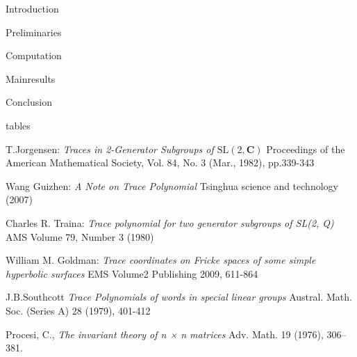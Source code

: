 \documentclass[12pt,reqno,letter,oneside,openright]{book}
\numberwithin{equation}{chapter}
\theoremstyle{definition}
\begin{document}


\pagestyle{fancy}%
\lhead{\leftmark}%
\rhead{}%
\chead{}%
\cfoot{\thepage}%
\renewcommand{\headrulewidth}{0pt}


\tableofcontents


\mainmatter

 \setcounter{page}{1}





{Introduction}

{Preliminaries}

{Computation}

{Mainresults}

{Conclusion}

{tables}


\newpage
\thispagestyle{empty}%
\backmatter

\begin{thebibliography}{3}
T.Jorgensen:
\emph{Traces in 2-Generator Subgroups of $\mathrm{SL}(2,\mathbf{C})$} 
Proceedings of the American Mathematical Society, Vol. 84, No. 3 (Mar., 1982), pp.339-343

Wang Guizhen:
\emph{A Note on Trace Polynomial}
Tsinghua science and technology (2007)
 
Charles R. Traina:
\emph{Trace polynomial for two generator subgroups of SL(2, Q)}
AMS Volume 79, Number 3 (1980)
 
William M. Goldman:
\emph{Trace coordinates on Fricke spaces of some
simple hyperbolic surfaces}
EMS Volume2 Publishing 2009, 611-864
 
J.B.Southcott
\emph{Trace Polynomials of words in special linear groups}
Austral. Math. Soc. (Series A) 28 (1979), 401-412

Procesi, C.,
\emph{The invariant theory of n × n matrices}
Adv. Math. 19 (1976), 306–381.
\end{thebibliography}
\newpage
\end{document}
